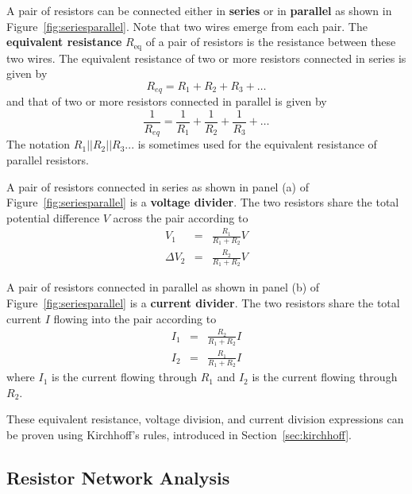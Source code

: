 \documentclass[11pt]{article}
\begin{document}
A pair of resistors can be connected either in \textbf{series} or in
\textbf{parallel} as shown in Figure~\ref{fig:seriesparallel}.  Note
that two wires emerge from each pair. The \textbf{equivalent
  resistance} $R_\mathrm{eq}$ of a pair of resistors is the resistance
between these two wires. The equivalent resistance of two or more
resistors connected in series is given by
\begin{equation}
  R_{eq} = R_1 + R_2 + R_3 + \ldots
  \label{eq:Rseries}
\end{equation}
and that of two or more resistors connected in parallel is given by
\begin{equation}
  \frac{1}{R_{eq}} = \frac{1}{R_1} + \frac{1}{R_2} + \frac{1}{R_3} +
  \ldots
  \label{eq:Rparallel}
\end{equation}
The notation $R_1||R_2||R_3...$ is sometimes used for the equivalent
resistance of parallel resistors.

A pair of resistors connected in series as shown in panel (a) of
Figure~\ref{fig:seriesparallel} is a \textbf{voltage divider}. The two
resistors share the total potential difference $V$ across the
pair according to
\begin{eqnarray}
  \nonumber
  V_1 & = & \frac{R_1}{R_1 + R_2} V \\ \Delta
  V_2 & = & \frac{R_2}{R_1 + R_2} V
  \label{eq:Vdiv}
\end{eqnarray}

A pair of resistors connected in parallel as shown in panel (b) of
Figure~\ref{fig:seriesparallel} is a \textbf{current divider}. The two
resistors share the total current $I$ flowing into the pair according
to
\begin{eqnarray}
  \nonumber I_1 & = & \frac{R_2}{R_1 + R_2} I \\ I_2 & = &
  \frac{R_1}{R_1 + R_2} I
  \label{eq:Idiv}
\end{eqnarray}
where $I_1$ is the current flowing through $R_1$ and $I_2$ is the
current flowing through $R_2$.

These equivalent resistance, voltage division, and current division
expressions can be proven using Kirchhoff's rules, introduced in
Section~\ref{sec:kirchhoff}.

\subsection{Resistor Network Analysis}
\end{document}
